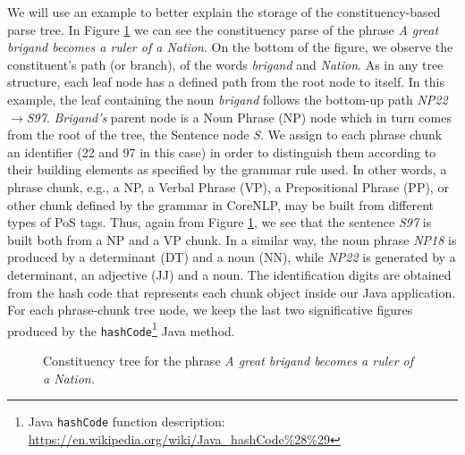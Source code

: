 We will use an example to better explain the storage of the constituency-based parse tree. In Figure \ref{fig:tree} we can see the constituency parse of the phrase  \textit{A great brigand becomes a ruler of a Nation}. On the bottom of the figure, we observe the constituent's path (or branch), of the words \textit{brigand} and \textit{Nation}. As in any tree structure, each leaf node has a defined path from the root node to itself. In this example, the leaf containing the noun \textit{brigand} 
 follows the bottom-up path \textit{NP22}$\rightarrow$\textit{S97}. \textit{Brigand's} parent node is a Noun Phrase (NP) node which in turn comes from the root of the tree, the Sentence node \textit{S}. We assign to each phrase chunk an identifier (22 and 97 in this case) in order to distinguish them according to their building elements as specified by the grammar rule used.
  In other words, a phrase chunk, e.g., a NP, a Verbal Phrase (VP), a Prepositional Phrase (PP), or other chunk defined by the grammar in CoreNLP, may be built from different types of PoS tags. Thus, again from Figure \ref{fig:tree}, we see that the sentence \textit{S97} is  built both from a NP and a VP chunk. 
 In a similar way, the noun phrase \textit{NP18} is produced by a determinant (DT) and a noun (NN), while  \textit{NP22} is generated by a determinant, an adjective (JJ) and a noun.
  The identification digits are obtained from the hash code that represents each chunk object inside our Java application. For each phrase-chunk tree node, we keep the last two significative figures produced by the \texttt{hashCode}\footnote{Java \texttt{hashCode} function description: \url{https://en.wikipedia.org/wiki/Java\_hashCode\%28\%29}} Java method.


\begin{figure}[]

\caption{Constituency tree for the phrase \textit{{A great brigand becomes a ruler of a Nation}.}
}
\label{fig:tree}
\end{figure}

